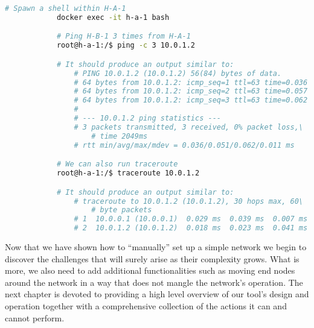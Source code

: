         \begin{lstlisting}[language = bash, caption = Testing the Sample Topology., label = lst:sample-topology-test]
            # Spawn a shell within H-A-1
            docker exec -it h-a-1 bash

            # Ping H-B-1 3 times from H-A-1
            root@h-a-1:/$ ping -c 3 10.0.1.2

            # It should produce an output similar to:
                # PING 10.0.1.2 (10.0.1.2) 56(84) bytes of data.
                # 64 bytes from 10.0.1.2: icmp_seq=1 ttl=63 time=0.036 ms
                # 64 bytes from 10.0.1.2: icmp_seq=2 ttl=63 time=0.057 ms
                # 64 bytes from 10.0.1.2: icmp_seq=3 ttl=63 time=0.062 ms
                #
                # --- 10.0.1.2 ping statistics ---
                # 3 packets transmitted, 3 received, 0% packet loss,\
                    # time 2049ms
                # rtt min/avg/max/mdev = 0.036/0.051/0.062/0.011 ms

            # We can also run traceroute
            root@h-a-1:/$ traceroute 10.0.1.2

            # It should produce an output similar to:
                # traceroute to 10.0.1.2 (10.0.1.2), 30 hops max, 60\
                    # byte packets
                # 1  10.0.0.1 (10.0.0.1)  0.029 ms  0.039 ms  0.007 ms
                # 2  10.0.1.2 (10.0.1.2)  0.018 ms  0.023 ms  0.041 ms
        \end{lstlisting}

    Now that we have shown how to ``manually'' set up a simple network we begin to discover the challenges that will surely arise as their complexity grows. What is more, we also need to add additional functionalities such as moving end nodes around the network in a way that does not mangle the network's operation. The next chapter is devoted to providing a high level overview of our tool's design and operation together with a comprehensive collection of the actions it can and cannot perform.
